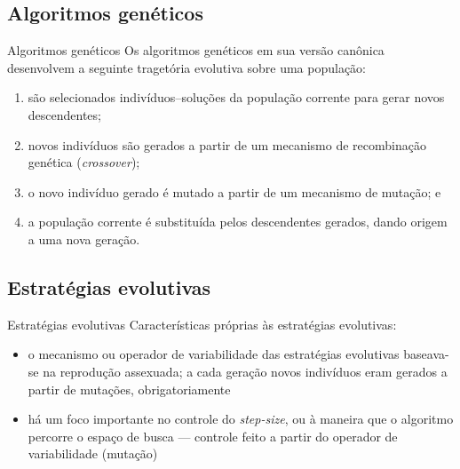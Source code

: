 \documentclass{beamer}
\begin{document}
\subsection{Algoritmos genéticos}
\begin{frame}{Algoritmos genéticos}
Os algoritmos gen\'{e}ticos em sua vers\~{a}o can\^{o}nica desenvolvem a seguinte traget\'{o}ria evolutiva sobre uma
popula\c{c}\~{a}o:
\begin{enumerate}
\item<1-> s\~{a}o selecionados indiv\'{i}duos--solu\c{c}\~{o}es da popula\c{c}\~{a}o corrente para gerar novos descendentes;
\item<2-> novos indiv\'{i}duos s\~{a}o gerados a partir de um mecanismo de recombina\c{c}\~{a}o gen\'{e}tica (\textit{crossover});
\item<3-> o novo indiv\'{i}duo gerado \'{e} mutado a partir de um mecanismo de muta\c{c}\~{a}o; e
\item<4-> a popula\c{c}\~{a}o corrente \'{e} substitu\'{i}da pelos descendentes gerados, dando origem a uma nova gera\c{c}\~{a}o.
\end{enumerate}
\end{frame}

\subsection{Estratégias evolutivas}
\begin{frame}{Estratégias evolutivas}
Características próprias às estratégias evolutivas:
\begin{itemize}
\item<1-> o mecanismo ou operador de variabilidade das estrat\'{e}gias evolutivas baseava-se na reprodu\c{c}\~{a}o assexuada; a cada gera\c{c}\~{a}o
novos indiv\'{i}duos eram gerados a partir de muta\c{c}\~{o}es, obrigatoriamente
\item<2-> h\'{a} um foco importante no controle do \textit{step-size}, ou \`{a} maneira que o algoritmo percorre o espa\c{c}o de busca --- controle
feito a partir do operador de variabilidade (muta\c{c}\~{a}o)
\end{itemize}
\end{frame}
\end{document}
